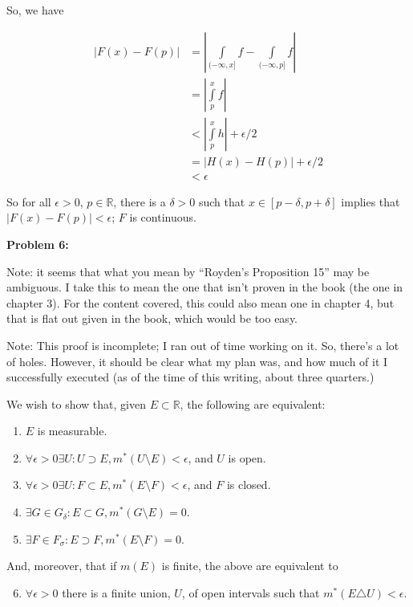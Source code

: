 \documentclass[a4paper,12pt]{article}
\newcommand{\shunt}{\vspace{20mm}}
\newcommand{\absval}[1]{\left\lvert #1 \right\rvert}
\newcommand{\de}{\delta}
\newcommand{\ep}{\epsilon}
\newcommand{\si}{\sigma}
\newcommand{\R}{\mathbb{R}}
\begin{document}
So, we have

\begin{align*}
\absval{F(x)-F(p)} &= \absval{\int\limits_{(-\infty,x]} f - \int\limits_{(-\infty,p]} f} \\
&=\absval{\int\limits_p^x f} \\
&<\absval{\int\limits_p^x h} + \ep/2 \\
&=\absval{H(x)-H(p)} + \ep/2\\
&< \ep
\end{align*}

So for all $\ep>0$, $p \in \R$, there is a $\de >0$ such that $x \in [p-\de, p+\de]$ implies that $\absval{F(x)-F(p)} < \ep$; $F$ is continuous.

\shunt

{\bf Problem 6:}

Note: it seems that what you mean by ``Royden's Proposition 15'' may be ambiguous. I take this to mean the one that isn't proven in the book (the one in chapter 3). For the content covered, this could also mean one in chapter 4, but that is flat out given in the book, which would be too easy.

Note: This proof is incomplete; I ran out of time working on it. So, there's a lot of holes. However, it should be clear what my plan was, and how much of it I successfully executed (as of the time of this writing, about three quarters.)

We wish to show that, given $E \subset \R$, the following are equivalent:

\begin{enumerate}
\item $E$ is measurable.
\item $\forall \ep >0 \exists U: U \supset E, m^*(U \setminus E) < \ep$, and $U$ is open.
\item $\forall \ep >0 \exists U: F \subset E, m^*(E \setminus F) < \ep$, and $F$ is closed.
\item $\exists G \in G_\de : E \subset G, m^*(G \setminus E) = 0$.
\item $\exists F \in F_\si : E \supset F, m^*(E \setminus F) = 0$.
\end{enumerate}

And, moreover, that if $m(E)$ is finite, the above are equivalent to

\begin{enumerate}
\setcounter{enumi}{5}
\item $\forall \ep >0$ there is a finite union, $U$, of open intervals such that $m^*(E \triangle U) < \ep$.
\end{enumerate}
\end{document}
